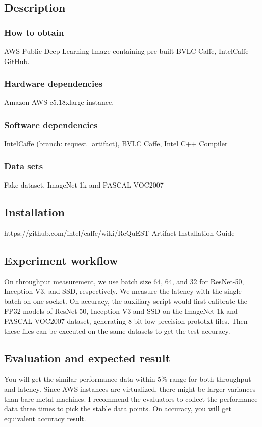 \documentclass[sigplan]{acmart}
\begin{document}
\subsection{Description}

\subsubsection{How to obtain}
AWS Public Deep Learning Image containing pre-built BVLC Caffe, IntelCaffe GitHub.
\subsubsection{Hardware dependencies}
Amazon AWS c5.18xlarge instance.
\subsubsection{Software dependencies}
IntelCaffe (branch: request\_artifact), BVLC Caffe, Intel\textsuperscript{\textregistered} C++ Compiler
\subsubsection{Data sets}
Fake dataset, ImageNet-1k and PASCAL VOC2007
\subsection{Installation}
https://github.com/intel/caffe/wiki/ReQuEST-Artifact-Installation-Guide

\subsection{Experiment workflow}
On throughput measurement, we use batch size 64, 64, and 32 for ResNet-50, Inception-V3, and SSD, respectively. We measure the latency with the single batch on one socket. On accuracy, the auxiliary script would first calibrate the FP32 models of ResNet-50, Inception-V3 and SSD on the ImageNet-1k and PASCAL VOC2007 dataset, generating 8-bit low precision prototxt files. Then these files can be executed on the same datasets to get the test accuracy.
\subsection{Evaluation and expected result}
You will get the similar performance data within 5\% range for both throughput and latency. Since AWS instances are virtualized, there might be larger variances than bare metal machines. I recommend the evaluators to collect the performance data three times to pick the stable data points. On accuracy, you will get equivalent accuracy result.
\end{document}
